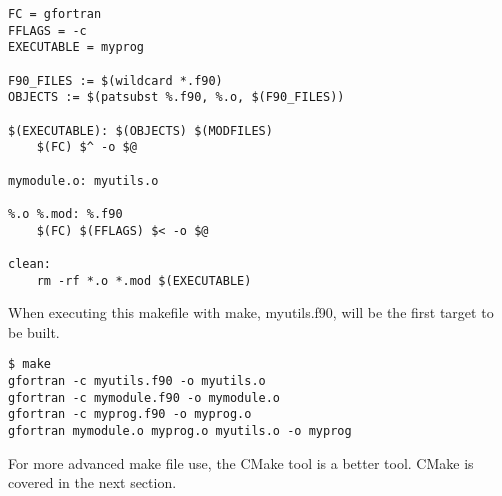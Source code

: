 \mmode

\begin{lstlisting}
FC = gfortran
FFLAGS = -c
EXECUTABLE = myprog

F90_FILES := $(wildcard *.f90)
OBJECTS := $(patsubst %.f90, %.o, $(F90_FILES))

$(EXECUTABLE): $(OBJECTS) $(MODFILES)
	$(FC) $^ -o $@
	
mymodule.o: myutils.o

%.o %.mod: %.f90
	$(FC) $(FFLAGS) $< -o $@
	
clean:
	rm -rf *.o *.mod $(EXECUTABLE)

\end{lstlisting}

When executing this makefile with make, myutils.f90, will be the first target to be built.

\cmdmode

\begin{lstlisting}
$ make
gfortran -c myutils.f90 -o myutils.o
gfortran -c mymodule.f90 -o mymodule.o
gfortran -c myprog.f90 -o myprog.o
gfortran mymodule.o myprog.o myutils.o -o myprog
\end{lstlisting}

For more advanced make file use, the CMake tool is a better tool. CMake is covered in the next section.


